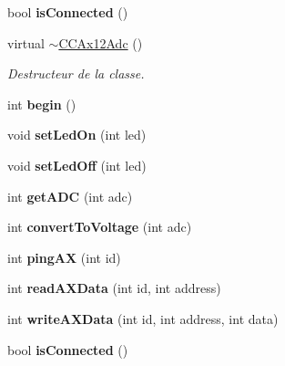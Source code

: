 \begin{DoxyCompactItemize}
bool {\bfseries is\+Connected} ()
\item 
\mbox{\label{classCCAx12Adc_a9eae943748844e490af64c385d7cc1e7}} 
virtual \hyperlink{classCCAx12Adc_a9eae943748844e490af64c385d7cc1e7}{$\sim$\+C\+C\+Ax12\+Adc} ()
\begin{DoxyCompactList}\small\item\em Destructeur de la classe. \end{DoxyCompactList}\item 
\mbox{\label{classCCAx12Adc_ad4b4b189eae34b868a70c0627e4f616b}} 
int {\bfseries begin} ()
\item 
\mbox{\label{classCCAx12Adc_a85d21062dfabb83ba1851341464e4ceb}} 
void {\bfseries set\+Led\+On} (int led)
\item 
\mbox{\label{classCCAx12Adc_af2c5e8ac33096b2316d35aad400e3585}} 
void {\bfseries set\+Led\+Off} (int led)
\item 
\mbox{\label{classCCAx12Adc_ad83f5d15bd8068ee822b2d5860f3f0f3}} 
int {\bfseries get\+A\+DC} (int adc)
\item 
\mbox{\label{classCCAx12Adc_a0c115e78034fdef80dad1466f1137442}} 
int {\bfseries convert\+To\+Voltage} (int adc)
\item 
\mbox{\label{classCCAx12Adc_ab26fb446defd5a6fb4c0695a2834bb57}} 
int {\bfseries ping\+AX} (int id)
\item 
\mbox{\label{classCCAx12Adc_af95b4426fbb54ee143cbe5000d0ca5d8}} 
int {\bfseries read\+A\+X\+Data} (int id, int address)
\item 
\mbox{\label{classCCAx12Adc_a6a505e9a0944b62ec52f59a9ec8085fe}} 
int {\bfseries write\+A\+X\+Data} (int id, int address, int data)
\item 
\mbox{\label{classCCAx12Adc_a8d4836cc205f0e332409c73337561460}} 
bool {\bfseries is\+Connected} ()
\end{DoxyCompactItemize}
